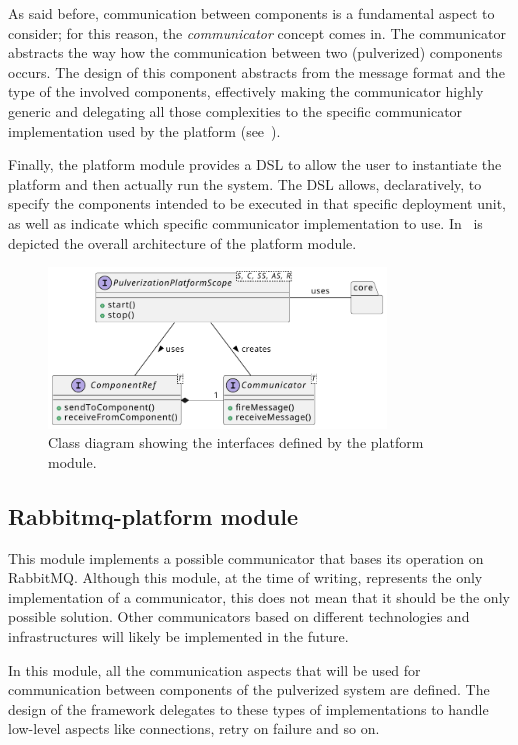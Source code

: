 As said before, communication between components is a fundamental aspect to consider; for this reason, the \emph{communicator} concept comes in.
The communicator abstracts the way how the communication between two (pulverized) components occurs.
The design of this component abstracts from the message format and the type of the involved components, effectively making the communicator highly
generic and delegating all those complexities to the specific communicator implementation used by the platform
(see~).

Finally, the platform module provides a DSL to allow the user to instantiate the platform and then actually run the system.
The DSL allows, declaratively, to specify the components intended to be executed in that specific deployment unit, as well as indicate which
specific communicator implementation to use. In~ is depicted the overall architecture of the platform module.

\begin{figure}
	\centering
	\includegraphics[width=0.8\textwidth]{figures/platform-design-interfaces.pdf}
	\caption{Class diagram showing the interfaces defined by the platform module.}
	\label{fig:platform-module-architecture}
\end{figure}

\subsection{Rabbitmq-platform module}
\label{sec:rabbitmq-platform-module}

This module implements a possible communicator that bases its operation on RabbitMQ. Although this module, at the time of writing, represents
the only implementation of a communicator, this does not mean that it should be the only possible solution.
Other communicators based on different technologies and infrastructures will likely be implemented in the future.

In this module, all the communication aspects that will be used for communication between components of the pulverized system are defined.
The design of the framework delegates to these types of implementations to handle low-level aspects like connections, retry on failure and so on.

